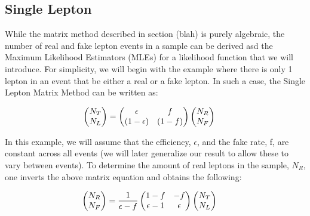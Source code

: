 \subsection{Single Lepton}

While the matrix method described in section (blah) is purely algebraic, the number of real and fake lepton events in a sample can be derived asd the Maximum Likelihood Estimators (MLEs) for a likelihood function that we will introduce.
For simplicity, we will begin with the example where there is only 1 lepton in an event that be either a real or a fake lepton.
In such a case, the Single Lepton Matrix Method can be written as:

\begin{equation}
  \label{eqn:single_lepton_matrix_standard}
  \hspace{-0.5cm}
  \begin{pmatrix}
    N_{T}\\
    N_{L} \\
  \end{pmatrix} 
  = 
  \begin{pmatrix}
    \epsilon & f \\
    (1-\epsilon) & (1-f) \\
  \end{pmatrix}
  \begin{pmatrix}
    N_{R} \\
    N_{F} \\
  \end{pmatrix}
\end{equation}

In this example, we will assume that the efficiency, $\epsilon$, and the fake rate, f, are constant across all events (we will later generalize our result to allow these to vary between events).
To determine the amount of real leptons in the sample, $N_{R}$, one inverts the above matrix equation and obtains the following:

\begin{equation}
  \label{eqn:single_lepton_matrix_standard_inverted}
  \hspace{-0.5cm}
  \begin{pmatrix}
    N_{R}\\
    N_{F} \\
  \end{pmatrix} 
  = \frac{1}{\epsilon - f}
  \begin{pmatrix}
    1-f & -f \\
    \epsilon-1 & \epsilon \\
  \end{pmatrix}
  \begin{pmatrix}
    N_{T} \\
    N_{L} \\
  \end{pmatrix}
\end{equation}

